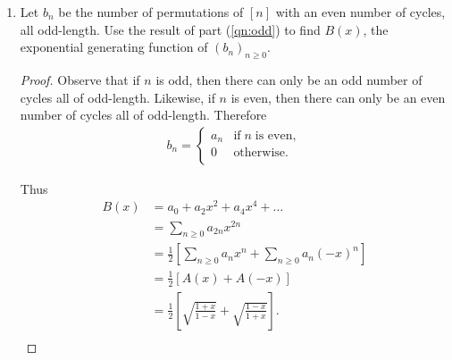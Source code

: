 \documentclass{article}
\begin{document}
\begin{enumerate}[label={\bf Q\arabic*:}]
\begin{enumerate}
\begin{proof}
          Then
          \[A(x) =\exp{\left(C(x)\right)}
          =\exp{\left(\ln{\sqrt{\frac{1+x}{1-x}}}\right)}
          =\sqrt{\frac{1+x}{1-x}}.\]
        \end{proof}

      \item Let $b_n$ be the number of permutations of $[n]$ with an even
        number of cycles, all odd-length. Use the result of
        part (\ref{qn:odd}) to find $B(x)$, the exponential generating
        function of $(b_n)_{n\geq0}$.

        \begin{proof}
          Observe that if $n$ is odd, then there can only be an odd number
          of cycles all of odd-length. Likewise, if $n$ is even, then there
          can only be an even number of cycles all of odd-length. Therefore
          \begin{align*}
            b_n =
            \begin{cases}
              a_n &\text{if}\; n\; \text{is even},\\
              0 &\text{otherwise}.\\
            \end{cases}
          \end{align*}

          Thus
          \begin{align*}
            B(x) &=a_0+a_2x^2+a_4x^4+\ldots\\
            &=\sum_{n\geq0} a_{2n}x^{2n}\\
            &=\frac{1}{2} \left[\sum_{n\geq0} a_{n}x^{n} + \sum_{n\geq0}
              a_{n}(-x)^{n}\right]\\
            &=\frac{1}{2} \left[A(x) + A(-x)\right]\\
            &=\frac{1}{2} \left[\sqrt{\frac{1+x}{1-x}} +
              \sqrt{\frac{1-x}{1+x}}\right].\\
          \end{align*}
        \end{proof}
    \end{enumerate}
\end{enumerate}
\end{document}
